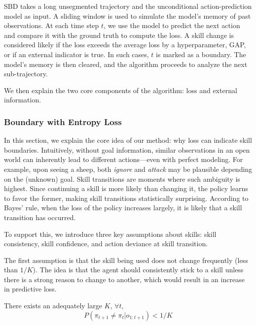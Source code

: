 SBD takes a long unsegmented trajectory and the unconditional action-prediction model as input. A sliding window is used to simulate the model's memory of past observations. At each time step $t$, we use the model to predict the next action and compare it with the ground truth to compute the loss. A skill change is considered likely if the loss exceeds the average loss by a hyperparameter, GAP, or if an external indicator is true. In such cases, $t$ is marked as a boundary. The model's memory is then cleared, and the algorithm proceeds to analyze the next sub-trajectory.

We then explain the two core components of the algorithm: loss and external information.

\subsubsection{Boundary with Entropy Loss}\label{subsec:loss}

In this section, we explain the core idea of our method: why loss can indicate skill boundaries. Intuitively, without goal information, similar observations in an open world can inherently lead to different actions—even with perfect modeling. For example, upon seeing a sheep, both \textit{ignore} and \textit{attack} may be plausible depending on the (unknown) goal. Skill transitions are moments where such ambiguity is highest. Since continuing a skill is more likely than changing it, the policy learns to favor the former, making skill transitions statistically surprising. According to Bayes' rule, when the loss of the policy increases largely, it is likely that a skill transition has occurred.

To support this, we introduce three key assumptions about skills: skill consistency, skill confidence, and action deviance at skill transition. 

The first assumption is that the skill being used does not change frequently (less than $1/K$). The idea is that the agent should consistently stick to a skill unless there is a strong reason to change to another, which would result in an increase in predictive loss.

\begin{assumption} \label{assumption: consistency}
There exists an adequately large $K$, $\forall t,$
\begin{equation}
    P(\pi_{t+1} \ne \pi_t|o_{1:t+1}) < 1/K
\end{equation}
\end{assumption}

